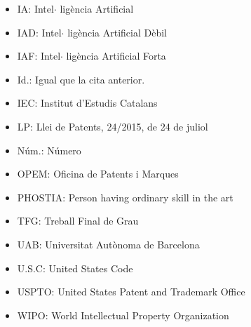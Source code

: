 \documentclass[12pt]{article}
\begin{document}
\vspace{\baselineskip}
\begin{itemize}
	\item IA: Intel$ \cdot $ ligència Artificial\par


\vspace{\baselineskip}
	\item IAD: Intel$ \cdot $ ligència Artificial Dèbil\par


\vspace{\baselineskip}
	\item IAF: Intel$ \cdot $ ligència Artificial Forta\par


\vspace{\baselineskip}
	\item Id.: Igual que la cita anterior.\par


\vspace{\baselineskip}
	\item IEC: Institut d’Estudis Catalans\par


\vspace{\baselineskip}
	\item LP: Llei de Patents, 24/2015, de 24 de juliol\par


\vspace{\baselineskip}
	\item Núm.: Número\par


\vspace{\baselineskip}
	\item OPEM: Oficina de Patents i Marques\par


\vspace{\baselineskip}
	\item PHOSTIA: Person having ordinary skill in the art\par


\vspace{\baselineskip}
	\item TFG: Treball Final de Grau\par


\vspace{\baselineskip}
	\item UAB: Universitat Autònoma de Barcelona\par


\vspace{\baselineskip}
	\item U.S.C: United States Code\par


\vspace{\baselineskip}
	\item USPTO: United States Patent and Trademark Office\par


\vspace{\baselineskip}
	\item WIPO: World Intellectual Property Organization
\end{itemize}\par
\end{document}
